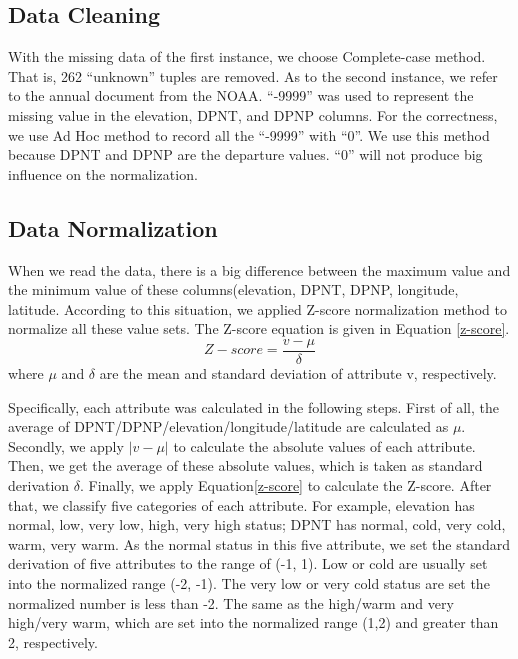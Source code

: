 \documentclass[11pt]{article}
\begin{document}
\subsection{Data Cleaning}
With the missing data of the first instance, we choose Complete-case method\cite{han2006data}. That is, 262 ``unknown'' tuples are removed. As to the second instance, we refer to the annual document from the NOAA. ``-9999'' was used to represent the missing value in the elevation, DPNT, and DPNP columns. For the correctness, we use Ad Hoc method to record all the ``-9999'' with ``0''. We use this method because DPNT and DPNP are the departure values. ``0'' will not produce big influence on the normalization.
\subsection{Data Normalization}
When we read the data, there is a big difference between the maximum value and the minimum value of these columns(elevation, DPNT, DPNP, longitude, latitude. According to this situation, we applied Z-score normalization method to normalize all these value sets. The Z-score equation is given in Equation \eqref{z-score}.
\begin{equation}
Z-score = \frac{v-\mu}{\delta} \label{z-score}
\end{equation}
where $\mu$ and $\delta$ are the mean and standard deviation of attribute v, respectively.

Specifically, each attribute was calculated in the following steps. First of all, the average of DPNT/DPNP/elevation/longitude/latitude are calculated as $\mu$. Secondly, we apply $|v-\mu|$ to calculate the absolute values of each attribute. Then, we get the average of these absolute values, which is taken as standard derivation $\delta$. Finally, we apply Equation\eqref{z-score} to calculate the Z-score.
After that, we classify five categories of each attribute. For example, elevation has normal, low, very low, high, very high status; DPNT has normal, cold, very cold, warm, very warm. As the normal status in this five attribute, we set the standard derivation of five attributes to the range of (-1, 1). Low or cold are usually set into the normalized range (-2, -1). The very low or very cold status are set the normalized number is less than -2. The same as the high/warm and very high/very warm, which are set into the normalized range (1,2) and greater than 2, respectively.
\end{document}
